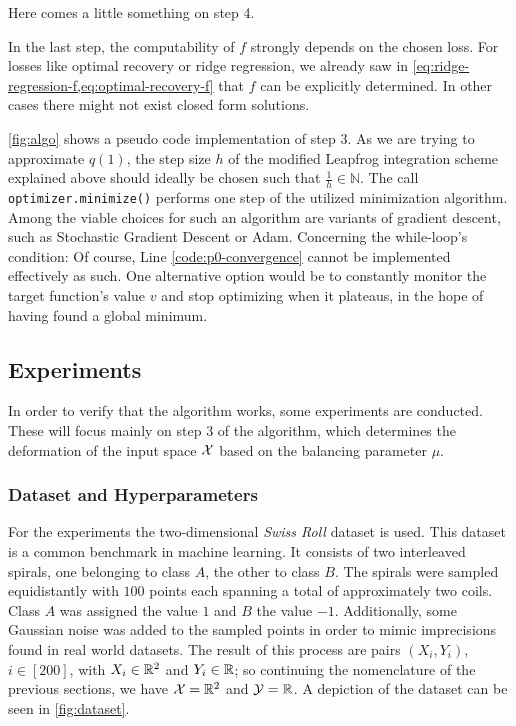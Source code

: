 Here comes a little something on step 4.

In the last step, the computability of $f$ strongly depends on the chosen loss.
For losses like optimal recovery or ridge regression, we already saw in \cref{eq:ridge-regression-f,eq:optimal-recovery-f} that $f$ can be explicitly determined.
In other cases there might not exist closed form solutions.



\cref{fig:algo} shows a pseudo code implementation of step 3.
As we are trying to approximate $q(1)$, the step size $h$ of the modified Leapfrog integration scheme explained above should ideally be chosen such that $\frac{1}{h} \in \mathbb{N}$.
The call \texttt{optimizer.minimize()} performs one step of the utilized minimization algorithm.
Among the viable choices for such an algorithm are variants of gradient descent, such as Stochastic Gradient Descent or Adam.
Concerning the while-loop's condition: Of course, Line \ref{code:p0-convergence} cannot be implemented effectively as such.
One alternative option would be to constantly monitor the target function's value $v$ and stop optimizing when it plateaus, in the hope of having found a global minimum.

\subsection{Experiments}

In order to verify that the algorithm works, some experiments are conducted.
These will focus mainly on step 3 of the algorithm, which determines the deformation of the input space $\mathcal{X}$ based on the balancing parameter $\mu$.

\subsubsection{Dataset and Hyperparameters}

For the experiments the two-dimensional \emph{Swiss Roll} dataset is used.
This dataset is a common benchmark in machine learning.
It consists of two interleaved spirals, one belonging to class $A$, the other to class $B$.
The spirals were sampled equidistantly with $100$ points each spanning a total of approximately two coils.
Class $A$ was assigned the value $1$ and $B$ the value $-1$.
Additionally, some Gaussian noise was added to the sampled points in order to mimic imprecisions found in real world datasets.
The result of this process are pairs $(X_i, Y_i)$, $i \in [200]$, with $X_i \in \mathbb{R}^2$ and $Y_i \in \mathbb{R}$; so continuing the nomenclature of the previous sections, we have $\mathcal{X} = \mathbb{R}^2$ and $\mathcal{Y} = \mathbb{R}$.
A depiction of the dataset can be seen in \cref{fig:dataset}. 


